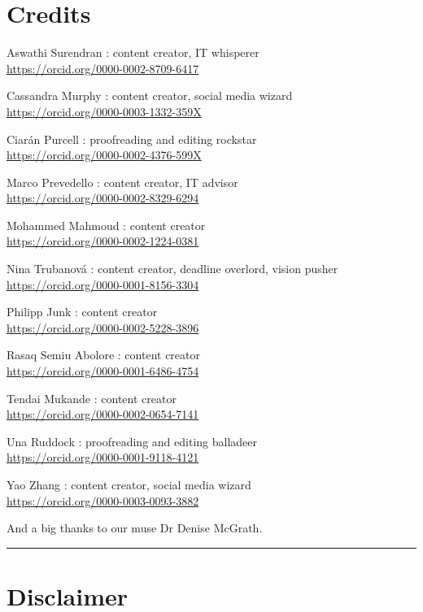 \documentclass[
]{book}
\begin{document}
\hypertarget{credits}{%
\section*{Credits}\label{credits}}

Aswathi Surendran : content creator, IT whisperer\\
\url{https://orcid.org/0000-0002-8709-6417}

Cassandra Murphy : content creator, social media wizard\\
\url{https://orcid.org/0000-0003-1332-359X}

Ciarán Purcell : proofreading and editing rockstar\\
\url{https://orcid.org/0000-0002-4376-599X}

Marco Prevedello : content creator, IT advisor ~\\
\url{https://orcid.org/0000-0002-8329-6294}

Mohammed Mahmoud : content creator\\
\url{https://orcid.org/0000-0002-1224-0381}

Nina Trubanová : content creator, deadline overlord, vision pusher\\
\url{https://orcid.org/0000-0001-8156-3304}

Philipp Junk : content creator\\
\url{https://orcid.org/0000-0002-5228-3896}

Rasaq Semiu Abolore : content creator\\
\url{https://orcid.org/0000-0001-6486-4754}

Tendai Mukande : content creator\\
\url{https://orcid.org/0000-0002-0654-7141}

Una Ruddock : proofreading and editing balladeer\\
\url{https://orcid.org/0000-0001-9118-4121}

Yao Zhang : content creator, social media wizard\\
\url{https://orcid.org/0000-0003-0093-3882}

And a big thanks to our muse Dr Denise McGrath.

\begin{center}\rule{0.5\linewidth}{0.5pt}\end{center}

\hypertarget{disclaimer}{%
\section*{Disclaimer}\label{disclaimer}}
\end{document}
